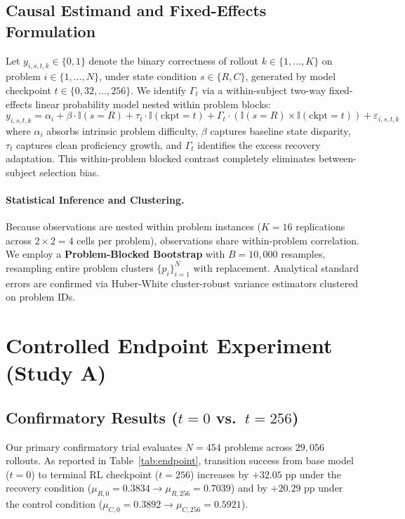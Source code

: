 \documentclass[11pt]{article}
\begin{document}
\subsection{Causal Estimand and Fixed-Effects Formulation}
Let $y_{i,s,t,k} \in \{0, 1\}$ denote the binary correctness of rollout $k \in \{1, \dots, K\}$ on problem $i \in \{1, \dots, N\}$, under state condition $s \in \{R, C\}$, generated by model checkpoint $t \in \{0, 32, \dots, 256\}$. We identify $\Gamma_t$ via a within-subject two-way fixed-effects linear probability model nested within problem blocks:
\begin{equation}
y_{i,s,t,k} = \alpha_i + \beta \cdot \mathbb{I}(s = R) + \tau_t \cdot \mathbb{I}(\text{ckpt} = t) + \Gamma_t \cdot (\mathbb{I}(s = R) \times \mathbb{I}(\text{ckpt} = t)) + \varepsilon_{i,s,t,k}
\end{equation}
where $\alpha_i$ absorbs intrinsic problem difficulty, $\beta$ captures baseline state disparity, $\tau_t$ captures clean proficiency growth, and $\Gamma_t$ identifies the excess recovery adaptation. This within-problem blocked contrast completely eliminates between-subject selection bias.

\paragraph{Statistical Inference and Clustering.}
Because observations are nested within problem instances ($K=16$ replications across $2 \times 2 = 4$ cells per problem), observations share within-problem correlation. We employ a \textbf{Problem-Blocked Bootstrap} with $B=10,000$ resamples, resampling entire problem clusters $\{p_i\}_{i=1}^N$ with replacement. Analytical standard errors are confirmed via Huber-White cluster-robust variance estimators clustered on problem IDs.

\section{Controlled Endpoint Experiment (Study A)}

\subsection{Confirmatory Results \texorpdfstring{($t=0$ vs.\ $t=256$)}{(t=0 vs t=256)}}
Our primary confirmatory trial evaluates $N=454$ problems across $29,056$ rollouts. As reported in Table~\ref{tab:endpoint}, transition success from base model ($t=0$) to terminal RL checkpoint ($t=256$) increases by $+32.05\text{ pp}$ under the recovery condition ($\mu_{R,0} = 0.3834 \to \mu_{R,256} = 0.7039$) and by $+20.29\text{ pp}$ under the control condition ($\mu_{C,0} = 0.3892 \to \mu_{C,256} = 0.5921$).
\end{document}

